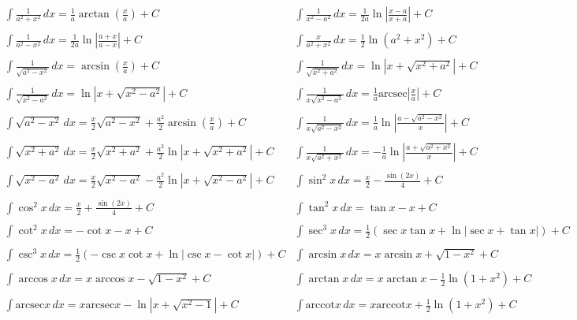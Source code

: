 \documentclass[oneside]{book}
\begin{document}
\[
\begin{array}{ll}
\int \frac{1}{a^2 + x^2} \, dx = \frac{1}{a}\arctan\left(\frac{x}{a}\right) + C & \int \frac{1}{x^2 - a^2} \, dx = \frac{1}{2a}\ln\left|\frac{x-a}{x+a}\right| + C \\ \\
\int \frac{1}{a^2 - x^2} \, dx = \frac{1}{2a}\ln\left|\frac{a+x}{a-x}\right| + C & \int \frac{x}{a^2 + x^2} \, dx = \frac{1}{2}\ln(a^2 + x^2) + C \\ \\
\int \frac{1}{\sqrt{a^2 - x^2}} \, dx = \arcsin\left(\frac{x}{a}\right) + C & \int \frac{1}{\sqrt{x^2 + a^2}} \, dx = \ln|x + \sqrt{x^2 + a^2}| + C \\ \\
\int \frac{1}{\sqrt{x^2 - a^2}} \, dx = \ln|x + \sqrt{x^2 - a^2}| + C & \int \frac{1}{x\sqrt{x^2 - a^2}} \, dx = \frac{1}{a}\text{arcsec}\left|\frac{x}{a}\right| + C \\ \\
\int \sqrt{a^2 - x^2} \, dx = \frac{x}{2}\sqrt{a^2 - x^2} + \frac{a^2}{2}\arcsin\left(\frac{x}{a}\right) + C & \int \frac{1}{x\sqrt{a^2 - x^2}} \, dx = \frac{1}{a}\ln\left|\frac{a - \sqrt{a^2 - x^2}}{x}\right| + C \\ \\
\int \sqrt{x^2 + a^2} \, dx = \frac{x}{2}\sqrt{x^2 + a^2} + \frac{a^2}{2}\ln|x + \sqrt{x^2 + a^2}| + C & \int \frac{1}{x\sqrt{a^2 + x^2}} \, dx = -\frac{1}{a}\ln\left|\frac{a + \sqrt{a^2 + x^2}}{x}\right| + C \\ \\
\int \sqrt{x^2 - a^2} \, dx = \frac{x}{2}\sqrt{x^2 - a^2} - \frac{a^2}{2}\ln|x + \sqrt{x^2 - a^2}| + C & \int \sin^2 x \, dx = \frac{x}{2} - \frac{\sin(2x)}{4} + C \\ \\
\int \cos^2 x \, dx = \frac{x}{2} + \frac{\sin(2x)}{4} + C & \int \tan^2 x \, dx = \tan x - x + C \\ \\
\int \cot^2 x \, dx = -\cot x - x + C & \int \sec^3 x \, dx = \frac{1}{2}(\sec x \tan x + \ln|\sec x + \tan x|) + C \\ \\
\int \csc^3 x \, dx = \frac{1}{2}(-\csc x \cot x + \ln|\csc x - \cot x|) + C & \int \arcsin x \, dx = x\arcsin x + \sqrt{1-x^2} + C \\ \\
\int \arccos x \, dx = x\arccos x - \sqrt{1-x^2} + C & \int \arctan x \, dx = x\arctan x - \frac{1}{2}\ln(1+x^2) + C \\ \\
\int \text{arcsec} x \, dx = x\text{arcsec} x - \ln|x + \sqrt{x^2 - 1}| + C & \int \text{arccot} x \, dx = x\text{arccot} x + \frac{1}{2}\ln(1+x^2) + C \\ \\
\end{array}
\]
\end{document}
